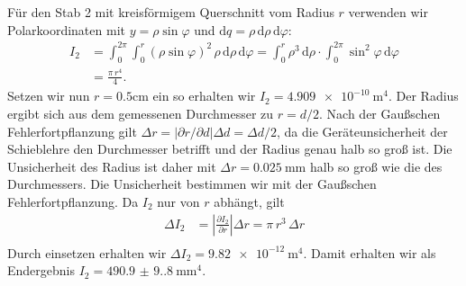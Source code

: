
Für den Stab 2 mit kreisförmigem Querschnitt vom Radius $r$ verwenden wir Polarkoordinaten mit $y = \rho \sin\varphi$ und $\mathrm{d}q = \rho \, \mathrm{d}\rho \, \mathrm{d}\varphi$:
\begin{align}
  I_2 &= \int_0^{2\pi} \int_0^r (\rho \sin\varphi)^2 \, \rho \, \mathrm{d}\rho \, \mathrm{d}\varphi
       = \int_0^r \rho^3 \, \mathrm{d}\rho \cdot \int_0^{2\pi} \sin^2\varphi \, \mathrm{d}\varphi \nonumber \\
      &= \frac{\pi \, r^4}{4}.
\end{align}
Setzen wir nun $r = 0.5 \unit{\centi\meter}$ ein so erhalten wir $I_2 = \qty{4.909e-10}{\meter\tothe{4}}$.
Der Radius ergibt sich aus dem gemessenen Durchmesser zu $r = d/2$. Nach der Gaußschen Fehlerfortpflanzung gilt $\Delta r = \left| \partial r / \partial d \right| \Delta d = \Delta d / 2$, da die Geräteunsicherheit der Schieblehre den Durchmesser betrifft und der Radius genau halb so groß ist.
Die Unsicherheit des Radius ist daher mit $\Delta r = \qty{0.025}{\milli\meter}$ halb so groß wie die des Durchmessers.
Die Unsicherheit bestimmen wir mit der Gaußschen Fehlerfortpflanzung. Da $I_2$ nur von $r$ abhängt, gilt
\begin{align}
  \Delta I_2 &= \left| \frac{\partial I_2}{\partial r} \right| \Delta r = \pi \, r^3 \, \Delta r \nonumber \\
\end{align}
Durch einsetzen erhalten wir $\Delta I_2 = \qty{9.82e-12}{\meter\tothe{4}} $.
Damit erhalten wir als Endergebnis $I_2 = \qty{490.9(9.8)}{\milli\meter\tothe{4}}$.

